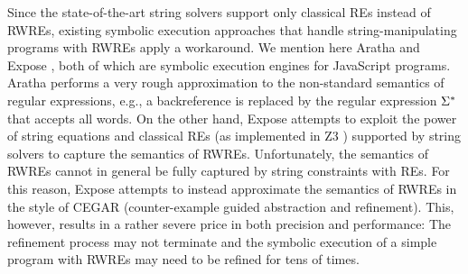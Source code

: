 Since the state-of-the-art string solvers support only classical REs instead of
RWREs, %
existing symbolic execution approaches that handle
string-manipulating programs with RWREs apply a workaround.
We mention here Aratha \cite{aratha} and Expose \cite{LMK19}, both of which are
symbolic execution engines for JavaScript programs.
Aratha performs a very rough approximation to the 
non-standard semantics of regular expressions, e.g., a backreference
is replaced by the regular expression $\Sigma^*$ that accepts all words.
On the other hand, Expose attempts to exploit the power of string 
equations and classical REs (as implemented in Z3 \cite{Z3}) supported by string
solvers to capture the 
semantics of RWREs. Unfortunately, the semantics of RWREs cannot 
in general be fully captured by string constraints with REs. 
For this reason, 
Expose attempts to instead approximate the semantics of RWREs in the style of 
CEGAR (counter-example guided abstraction and refinement). This, however,
results in a rather severe price in both precision and performance: The refinement process may not terminate and the symbolic execution of a simple program with RWREs may need to be refined for tens of times. 






